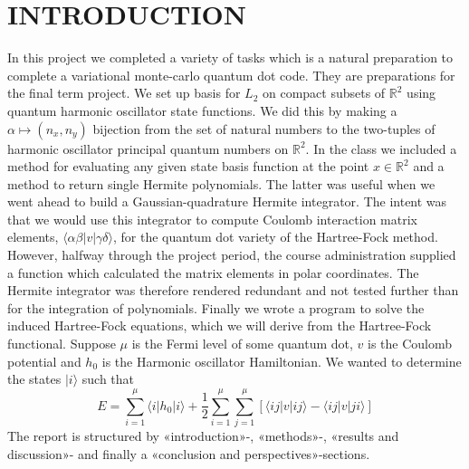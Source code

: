 \documentclass[11pt,english,a4paper]{article}
\begin{document}
\section*{\uppercase{Introduction}}
In this project we completed a variety of tasks which is a natural preparation to complete a variational monte-carlo quantum dot code. They are preparations for the final term project. We set up basis for $L_2$ on compact subsets of $\mathbb{R}^2$ using quantum harmonic oscillator state functions. We did this by making a $\alpha \mapsto (n_x,n_y)$ bijection from the set of natural numbers to the two-tuples of harmonic oscillator principal quantum numbers on $\mathbb{R}^2$. In the class we included a method for evaluating any given state basis function at the point $x \in \mathbb{R}^2$ and a method to return single Hermite polynomials. The latter was useful when we went ahead to build a Gaussian-quadrature Hermite integrator. The intent was that we would use this integrator to compute Coulomb interaction matrix elements,  $\langle \alpha \beta | v | \gamma\delta \rangle$, for the quantum dot variety of the Hartree-Fock method. However, halfway through the project period, the course administration supplied a function which calculated the matrix elements in polar coordinates. The Hermite integrator was therefore rendered redundant and not tested further than for the integration of polynomials. Finally we wrote a program to solve the induced Hartree-Fock equations, which we will derive from the Hartree-Fock functional. Suppose $\mu$ is the Fermi level of some quantum dot, $v$ is the Coulomb potential and $h_0$ is the Harmonic oscillator Hamiltonian. We wanted to determine the states $ |  i \rangle$ such that 
\begin{equation}
E = \sum_{i=1}^\mu \langle i | h_0 | i \rangle + \frac{1}{2} \sum_{i=1}^\mu \sum_{j = 1}^\mu \left[ \langle ij | v | ij \rangle - \langle ij | v | ji \rangle  \right]
\label{eq:HF}
\end{equation}
The report is structured by «introduction»-, «methods»-, «results and discussion»- and finally a «conclusion and perspectives»-sections.
\end{document}
